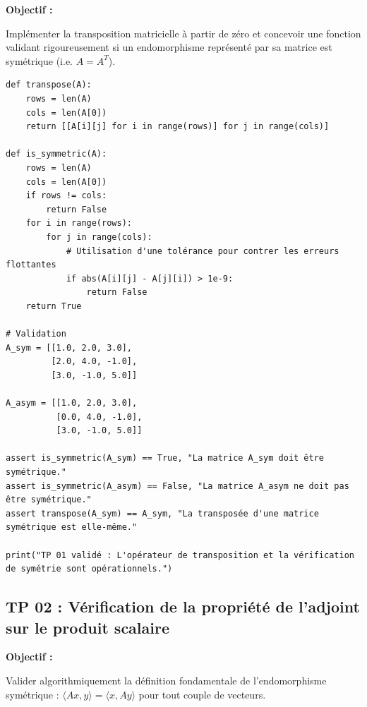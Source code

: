 \documentclass[11pt,a4paper]{article}
\begin{document}
\textbf{Objectif :}

Implémenter la transposition matricielle à partir de zéro et concevoir une fonction validant rigoureusement si un endomorphisme représenté par sa matrice est symétrique (i.e. $A = A^T$).



\begin{lstlisting}
def transpose(A):
    rows = len(A)
    cols = len(A[0])
    return [[A[i][j] for i in range(rows)] for j in range(cols)]

def is_symmetric(A):
    rows = len(A)
    cols = len(A[0])
    if rows != cols:
        return False
    for i in range(rows):
        for j in range(cols):
            # Utilisation d'une tolérance pour contrer les erreurs flottantes
            if abs(A[i][j] - A[j][i]) > 1e-9:
                return False
    return True

# Validation
A_sym = [[1.0, 2.0, 3.0],
         [2.0, 4.0, -1.0],
         [3.0, -1.0, 5.0]]

A_asym = [[1.0, 2.0, 3.0],
          [0.0, 4.0, -1.0],
          [3.0, -1.0, 5.0]]

assert is_symmetric(A_sym) == True, "La matrice A_sym doit être symétrique."
assert is_symmetric(A_asym) == False, "La matrice A_asym ne doit pas être symétrique."
assert transpose(A_sym) == A_sym, "La transposée d'une matrice symétrique est elle-même."

print("TP 01 validé : L'opérateur de transposition et la vérification de symétrie sont opérationnels.")
\end{lstlisting}

\subsection*{TP 02 : Vérification de la propriété de l'adjoint sur le produit scalaire}

\textbf{Objectif :}

Valider algorithmiquement la définition fondamentale de l'endomorphisme symétrique : $\langle Ax, y \rangle = \langle x, Ay \rangle$ pour tout couple de vecteurs.
\end{document}
